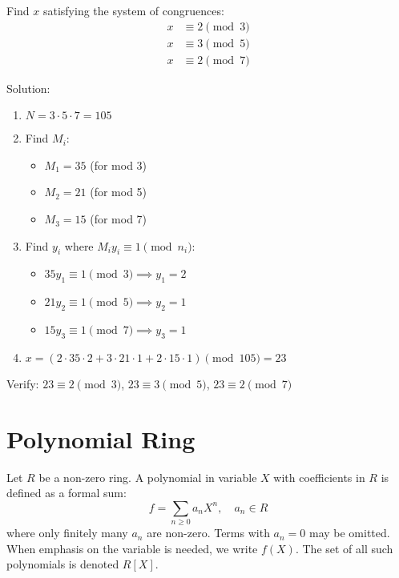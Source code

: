 \begin{example}
  Find $x$ satisfying the system of congruences:
  \begin{align*}
    x &\equiv 2 \pmod{3} \\
    x &\equiv 3 \pmod{5} \\
    x &\equiv 2 \pmod{7}
  \end{align*}

  Solution:
  \begin{enumerate}
    \item $N = 3 \cdot 5 \cdot 7 = 105$
    \item Find $M_i$:
      \begin{itemize}
        \item $M_1 = 35$ (for mod 3)
        \item $M_2 = 21$ (for mod 5)
        \item $M_3 = 15$ (for mod 7)
      \end{itemize}
    \item Find $y_i$ where $M_iy_i \equiv 1 \pmod{n_i}$:
      \begin{itemize}
        \item $35y_1 \equiv 1 \pmod{3} \implies y_1 = 2$
        \item $21y_2 \equiv 1 \pmod{5} \implies y_2 = 1$
        \item $15y_3 \equiv 1 \pmod{7} \implies y_3 = 1$
      \end{itemize}
    \item $x = (2 \cdot 35 \cdot 2 + 3 \cdot 21 \cdot 1 + 2 \cdot 15 \cdot 1) \pmod{105} = 23$
  \end{enumerate}

  Verify: $23 \equiv 2 \pmod{3}$, $23 \equiv 3 \pmod{5}$, $23 \equiv 2 \pmod{7}$
\end{example}

\section{Polynomial Ring}

\begin{definition}
  Let $R$ be a non-zero ring. A polynomial in variable $X$ with coefficients in $R$ is defined as a formal sum:
  \[
    f = \sum_{n \geq 0} a_nX^n, \quad a_n \in R
  \]
  where only finitely many $a_n$ are non-zero. Terms with $a_n = 0$ may be omitted. When emphasis on the variable is needed, we write $f(X)$. The set of all such polynomials is denoted $R[X]$.
\end{definition}

